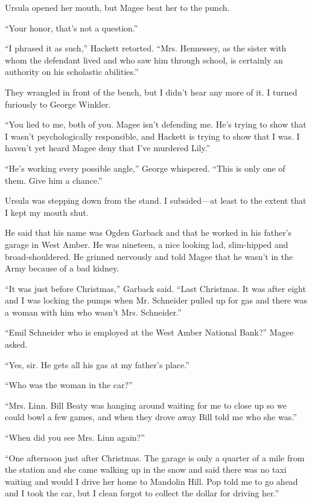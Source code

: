 \documentclass{novel}
\begin{document}
Ursula opened her mouth, but Magee beat her to the punch.

“Your honor, that’s not a question.”

“I phrased it as such,” Hackett retorted. “Mrs. Hennessey, as the sister with whom the defendant lived and who saw him through school, is certainly an authority on his scholastic abilities.”

They wrangled in front of the bench, but I didn’t hear any more of it. I turned furiously to George Winkler.

“You lied to me, both of you. Magee isn’t defending me. He’s trying to show that I wasn’t psychologically responsible, and Hackett is trying to show that I was. I haven’t yet heard Magee deny that I’ve murdered Lily.”

“He’s working every possible angle,” George whispered. “This is only one of them. Give him a chance.”

Ursula was stepping down from the stand. I subsided—at least to the extent that I kept my mouth shut.

\scenestars

He said that his name was Ogden Garback and that he worked in his father’s garage in West Amber. He was nineteen, a nice looking lad, slim-hipped and broad-shouldered. He grinned nervously and told Magee that he wasn’t in the Army because of a bad kidney.

“It was just before Christmas,” Garback said. “Last Christmas. It was after eight and I was locking the pumps when Mr. Schneider pulled up for gas and there was a woman with him who wasn’t Mrs. Schneider.”

“Emil Schneider who is employed at the West Amber National Bank?” Magee asked.

“Yes, sir. He gets all his gas at my father’s place.”

“Who was the woman in the car?”

“Mrs. Linn. Bill Beaty was hanging around waiting for me to close up so we could bowl a few games, and when they drove away Bill told me who she was.”

“When did you see Mrs. Linn again?”

“One afternoon just after Christmas. The garage is only a quarter of a mile from the station and she came walking up in the snow and said there was no taxi waiting and would I drive her home to Mandolin Hill. Pop told me to go ahead and I took the car, but I clean forgot to collect the dollar for driving her.”
\end{document}
